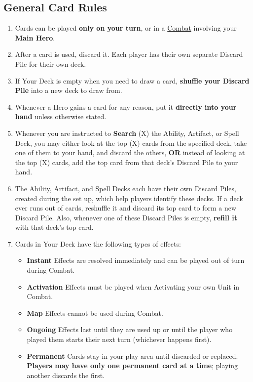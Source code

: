 \begin{multicols*}{2}
\subsection*{General Card Rules}
\begin{enumerate}
  \item Cards can be played \textbf{only on your turn}, or in a \hyperlink{Combat}{Combat} involving your \textbf{Main Hero}.
  \item After a card is used, discard it.
    Each player has their own separate Discard Pile for their own deck.
  \item If Your Deck is empty when you need to draw a card, \textbf{shuffle your Discard Pile} into a new deck to draw from.
  \item Whenever a Hero gains a card for any reason, put it \textbf{directly into your hand} unless otherwise stated.
  \item Whenever you are instructed to \textbf{Search} (X) the Ability, Artifact, or Spell Deck, you may either look at the top (X) cards from the specified deck, take one of them to your hand, and discard the others, \textbf{OR} instead of looking at the top (X) cards, add the top card from that deck's Discard Pile to your hand.
  \item The Ability, Artifact, and Spell Decks each have their own Discard Piles, created during the set up, which help players identify these decks.
    If a deck ever runs out of cards, reshuffle it and discard its top card to form a new Discard Pile.
    Also, whenever one of these Discard Piles is empty, \textbf{refill it} with that deck's top card.
  \item Cards in Your Deck have the following types of effects:
  \begin{itemize}
        \item \textbf{Instant}  Effects are resolved immediately and can be played out of turn during Combat.
        \item \textbf{Activation}  Effects must be played when Activating your own Unit in Combat.
        \item \textbf{Map}  Effects cannot be used during Combat.
        \item \textbf{Ongoing}  Effects last until they are used up or until the player who played them starts their next turn (whichever happens first).
        \item \textbf{Permanent}  Cards stay in your play area until discarded or replaced.
          \textbf{Players may have only one permanent card at a time}; playing another discards the first.
    \end{itemize}
\end{enumerate}


\end{multicols*}

